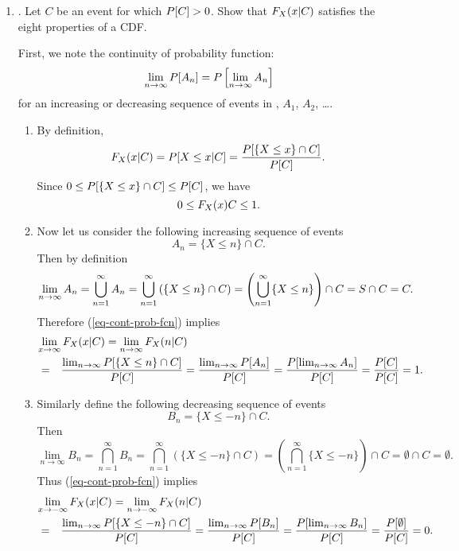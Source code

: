 \begin{enumerate}
	\item {}.
	Let $C$ be an event for which $P[C] > 0$.
	Show that $F_{X}(x|C)$
	satisfies the eight properties of a CDF.
	\ifdefined\sol
	\begin{solution}
	First, we note the continuity of probability function:
	\begin{equation}
	\label{eq-cont-prob-fcn}
		\lim_{n\to\infty} P[A_n] = P\left[\lim_{n\to\infty} A_n\right]
	\end{equation}
	for an increasing or decreasing sequence of events in \evcl,
	$A_1$, $A_2$, \ldots.

	\renewcommand{\labelenumii}{(\roman{enumii})}
	\begin{enumerate}
		\item
		By definition,
		\[
			F_{X}(x|C) = P[X \leq x|C]
			= \frac{P[\{X\leq x\} \cap C]}{P[C]}.
		\]
		Since $0\leq P[\{X\leq x\} \cap C] \leq P[C]$, we have
		\begin{equation}
			\label{eq-1}
			0 \leq F_{X}(x){C} \leq 1.
		\end{equation}

		\item
		Now let us consider the following increasing sequence of events
		\[
			A_n = \{X \leq n \} \cap C.
		\]
		Then by definition
		\[
			\lim_{n\to\infty} A_n
			= \bigcup_{n=1}^\infty A_n
			= \bigcup_{n=1}^\infty \left( \{X \leq n \} \cap C \right)
			= \left( \bigcup_{n=1}^\infty \{X \leq n \} \right) \cap C
			= S \cap C
			= C.
		\]
		Therefore (\ref{eq-cont-prob-fcn}) implies
		\begin{eqnarray}
		\nonumber
			\lefteqn{
			\lim_{x\to\infty} \ccdfxk{x}{C}
			= \lim_{n\to\infty} \ccdfxk{n}{C}
			}
			\\
			&=& \frac{\lim_{n\to\infty} \pr{\{X\leq n\}\cap C}}{\pr{C}}
			= \frac{\lim_{n\to\infty} \pr{A_n}}{\pr{C}}
			= \frac{\pr{\lim_{n\to\infty} A_n}}{\pr{C}}
			= \frac{\pr{C}}{\pr{C}}
			= 1.
			\label{eq-2}
		\end{eqnarray}

		\item
		Similarly define the following decreasing sequence of events
		\[
			B_n = \{X \leq -n \} \cap C.
		\]
		Then
		\[
			\lim_{n\to\infty} B_n
			= \bigcap_{n=1}^\infty B_n
			= \bigcap_{n=1}^\infty \left( \{X \leq -n \} \cap C \right)
			= \left( \bigcap_{n=1}^\infty \{X \leq -n \} \right) \cap C
			= \emptyset \cap C
			= \emptyset.
		\]
		Thus (\ref{eq-cont-prob-fcn}) implies
		\begin{eqnarray}
		\nonumber
			\lefteqn{
			\lim_{x\to-\infty} \ccdfxk{x}{C}
			= \lim_{n\to-\infty} \ccdfxk{n}{C}
			}
			\\
			&=& \frac{\lim_{n\to\infty} \pr{\{X\leq -n\}\cap C}}{\pr{C}}
			= \frac{\lim_{n\to\infty} \pr{B_n}}{\pr{C}}
			= \frac{\pr{\lim_{n\to\infty} B_n}}{\pr{C}}
			= \frac{\pr{\emptyset}}{\pr{C}}
			= 0.
			\label{eq-3}
		\end{eqnarray}


\end{enumerate}
\end{solution}
\end{enumerate}
